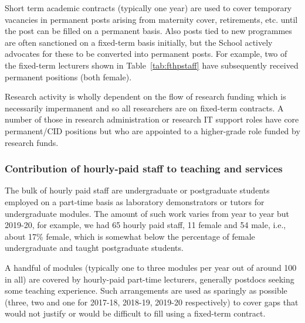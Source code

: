 Short term academic contracts (typically one year) are used 
to cover temporary vacancies in permanent posts arising from
maternity cover, retirements, etc. until the post can be filled on
a permanent basis. Also posts tied to new programmes are often
sanctioned on a fixed-term basis initially, but the School
actively advocates for these to be converted into permanent
posts.
For example, two of the fixed-term lecturers shown in 
Table~\ref{tab:fthpstaff} have subsequently received 
permanent positions (both female).


Research activity is wholly dependent on the flow of research 
funding which is necessarily impermanent and so all researchers 
are on fixed-term contracts. A number of those in research 
administration or research IT support roles have core
permanent/\ac{CID} positions but who are appointed to a 
higher-grade role funded by research funds.

\subsubsection{Contribution of hourly-paid staff to teaching and services}

The bulk of hourly paid staff are undergraduate or postgraduate students
employed on a part-time basis as laboratory demonstrators or tutors for
undergraduate modules. The amount of such work varies from year to year 
but 2019-20, for example, we had 65 hourly paid staff, 11 female and 54 
male, i.e., about 17\% female, which is somewhat below the percentage of 
female  undergraduate and taught postgraduate  students.

A handful of modules (typically one to three modules per year out of 
around 100 in all) are covered by hourly-paid part-time lecturers,
generally postdocs seeking some teaching experience. Such arrangements
are used as sparingly as possible (three, two and one for 2017-18, 
2018-19, 2019-20 respectively) to cover gaps that would not justify 
or would be difficult to fill using a fixed-term contract.


\newcommand{\actdeptsurvey}{Deleted}
\newcommand{\actdeptmarketing}{Amended}
\newcommand{\actdeptrolemodels}{Amended}
\newcommand{\actdeptfunds}{Deleted}
\newcommand{\actdeptcareerchoice}{Amended}
\newcommand{\actdeptpromisingfemale}{Amended}
\newcommand{\actdeptringfence}{Deleted}
\newcommand{\actdepthighlight}{Amended}
\newcommand{\actdeptseminar}{Deleted}
\newcommand{\actdeptinternships}{Amended}



